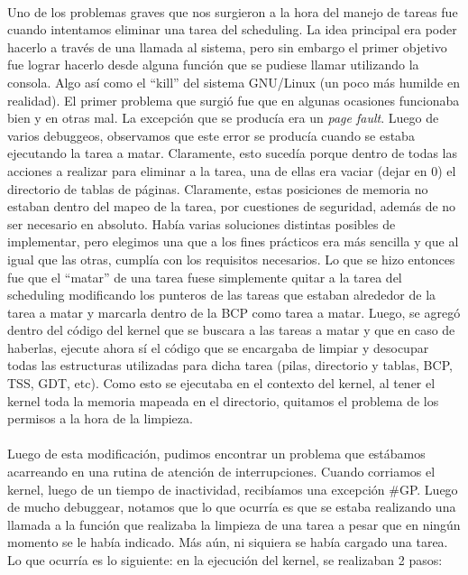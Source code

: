 \documentclass[11pt, a4paper]{article}
\begin{document}
\paragraph{}
Uno de los problemas graves que nos surgieron a la hora del manejo de tareas fue cuando intentamos eliminar una tarea del scheduling. La idea principal era poder hacerlo a través de una llamada al sistema, pero sin embargo el primer objetivo fue lograr hacerlo desde alguna función que se pudiese llamar utilizando la consola. Algo así como el ``kill'' del sistema GNU/Linux (un poco más humilde en realidad). El primer problema que surgió fue que en algunas ocasiones funcionaba bien y en otras mal. La excepción que se producía era un \textit{page fault}. Luego de varios debuggeos, observamos que este error se producía cuando se estaba ejecutando la tarea a matar. Claramente, esto sucedía porque dentro de todas las acciones a realizar para eliminar a la tarea, una de ellas era vaciar (dejar en 0) el directorio de tablas de páginas. Claramente, estas posiciones de memoria no estaban dentro del mapeo de la tarea, por cuestiones de seguridad, además de no ser necesario en absoluto. Había varias soluciones distintas posibles de implementar, pero elegimos una que a los fines prácticos era más sencilla y que al igual que las otras, cumplía con los requisitos necesarios. Lo que se hizo entonces fue que el ``matar'' de una tarea fuese simplemente quitar a la tarea del scheduling modificando los punteros de las tareas que estaban alrededor de la tarea a matar y marcarla dentro de la BCP como tarea a matar. Luego, se agregó dentro del código del kernel que se buscara a las tareas a matar y que en caso de haberlas, ejecute ahora sí el código que se encargaba de limpiar y desocupar todas las estructuras utilizadas para dicha tarea (pilas, directorio y tablas, BCP, TSS, GDT, etc). Como esto se ejecutaba en el contexto del kernel, al tener el kernel toda la memoria mapeada en el directorio, quitamos el problema de los permisos a la hora de la limpieza. 

\paragraph{}
Luego de esta modificación, pudimos encontrar un problema que estábamos acarreando en una rutina de atención de interrupciones. Cuando corriamos el kernel, luego de un tiempo de inactividad, recibíamos una excepción \#GP. Luego de mucho debuggear, notamos que lo que ocurría es que se estaba realizando una llamada a la función que realizaba la limpieza de una tarea a pesar que en ningún momento se le había indicado. Más aún, ni siquiera se había cargado una tarea. Lo que ocurría es lo siguiente: en la ejecución del kernel, se realizaban 2 pasos:
\end{document}
